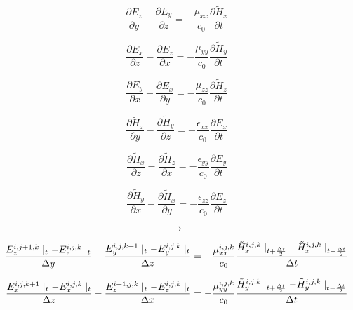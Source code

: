 \documentclass[a4paper,10pt]{article}
\begin{document}
\begin{equation*}
  \frac{\partial E_z}{\partial y} - \frac{\partial E_y}{\partial z} = -\frac{\mu_{xx}}{c_0}\frac{\partial\tilde{H}_x}{\partial t}
\end{equation*}

\begin{equation*}
  \frac{\partial E_x}{\partial z} - \frac{\partial E_z}{\partial x} = -\frac{\mu_{yy}}{c_0}\frac{\partial\tilde{H}_y}{\partial t}
\end{equation*}

\begin{equation*}
  \frac{\partial E_y}{\partial x} - \frac{\partial E_x}{\partial y} = -\frac{\mu_{zz}}{c_0}\frac{\partial\tilde{H}_z}{\partial t}
\end{equation*}

\begin{equation*}
  \frac{\partial \tilde{H}_z}{\partial y} - \frac{\partial \tilde{H}_y}{\partial z} = -\frac{\epsilon_{xx}}{c_0}\frac{\partial E_x}{\partial t}
\end{equation*}

\begin{equation*}
  \frac{\partial \tilde{H}_x}{\partial z} - \frac{\partial \tilde{H}_z}{\partial x} = -\frac{\epsilon_{yy}}{c_0}\frac{\partial E_y}{\partial t}
\end{equation*}

\begin{equation*}
  \frac{\partial \tilde{H}_y}{\partial x} - \frac{\partial \tilde{H}_x}{\partial y} = -\frac{\epsilon_{zz}}{c_0}\frac{\partial E_z}{\partial t}
\end{equation*}

\[\longrightarrow\]

\begin{equation*}
  \frac{E_{z}^{i,j+1,k}\mid_{t} - E_{z}^{i,j,k}\mid_{t}}{\Delta y} - \frac{E_{y}^{i,j,k+1}\mid_{t} - E_{y}^{i,j,k}\mid_{t}}{\Delta z} = -\frac{\mu_{xx}^{i,j,k}}{c_0} \frac{\tilde{H}_{x}^{i,j,k}\mid_{t+\frac  {\Delta t}{2}} - \tilde{H}_{x}^{i,j,k}\mid_{t-\frac{\Delta t}{2}}}{\Delta t}\notag
\end{equation*}

\begin{equation*}
  \frac{E_{x}^{i,j,k+1}\mid_{t} - E_{x}^{i,j,k}\mid_{t}}{\Delta z} - \frac{E_{z}^{i+1,j,k}\mid_{t} - E_{z}^{i,j,k}\mid_{t}}{\Delta x} = -\frac{\mu_{yy}^{i,j,k}}{c_0} \frac{\tilde{H}_{y}^{i,j,k}\mid_{t+\frac  {\Delta t}{2}} - \tilde{H}_{y}^{i,j,k}\mid_{t-\frac{\Delta t}{2}}}{\Delta t}\notag
\end{equation*}
\end{document}
